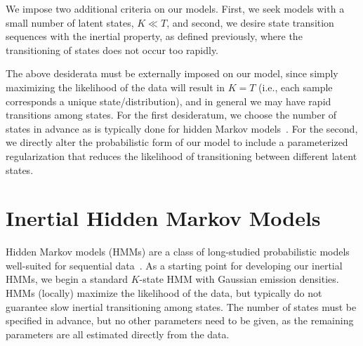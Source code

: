 \documentclass[letterpaper]{article}
\begin{document}
We impose two additional criteria on our models. First, we seek models
with a small number of latent states, $K \ll T$, and second, we desire state
transition sequences with the inertial property, as defined previously, where 
the transitioning of states does not occur too rapidly. 

The above desiderata must be externally imposed on our model, since simply
maximizing the likelihood of the data will result in $K = T$ (i.e., each sample
corresponds a unique state/distribution), and in general we may have rapid
transitions among states. For the first desideratum,  we choose the number of
states in advance as is typically done for hidden Markov
models~\cite{rabiner1989tutorial}. For the second, we directly alter the
probabilistic form of our model to include a parameterized regularization that
reduces the likelihood of transitioning between different latent states.

%
%
\section{Inertial Hidden Markov Models}

Hidden Markov models (HMMs) are a class of long-studied probabilistic models
well-suited for sequential data~\cite{rabiner1989tutorial}. As a starting point
for developing our inertial HMMs, we begin a standard $K$-state HMM with
Gaussian emission densities. HMMs (locally) maximize the likelihood of the data,
but typically do not guarantee slow inertial transitioning among states. The
number of states must be specified in advance, but no other parameters need to
be given, as the remaining parameters are all estimated directly from the
data.
\end{document}
